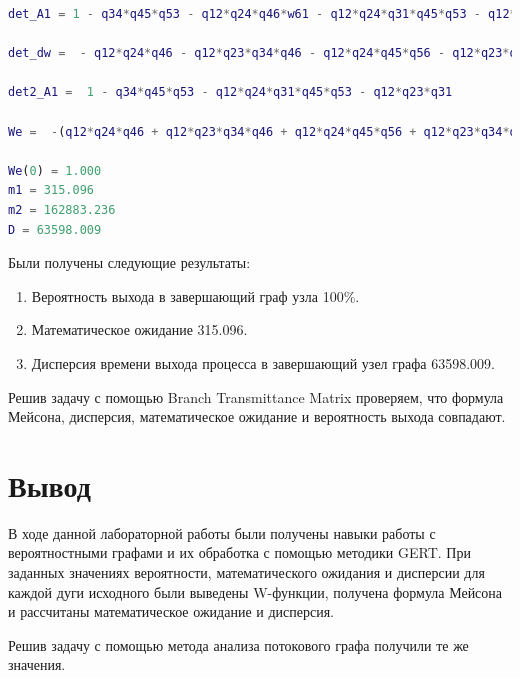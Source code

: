 \documentclass[14pt,a4paper,report]{report}
\begin{document}
\begin{lstlisting}[language={matlab}, caption={Результат}, basicstyle=\ttfamily]
det_A1 = 1 - q34*q45*q53 - q12*q24*q46*w61 - q12*q24*q31*q45*q53 - q12*q23*q34*q46*w61 - q12*q24*q45*q56*w61 - q12*q23*q34*q45*q56*w61 - q12*q23*q31
 
det_dw =  - q12*q24*q46 - q12*q23*q34*q46 - q12*q24*q45*q56 - q12*q23*q34*q45*q56
 
det2_A1 =  1 - q34*q45*q53 - q12*q24*q31*q45*q53 - q12*q23*q31
 
We =  -(q12*q24*q46 + q12*q23*q34*q46 + q12*q24*q45*q56 + q12*q23*q34*q45*q56)/(q12*q23*q31 + q34*q45*q53 + q12*q24*q31*q45*q53 - 1)
 
We(0) = 1.000
m1 = 315.096
m2 = 162883.236
D = 63598.009
\end{lstlisting}

Были получены следующие результаты:
\begin{enumerate}
\item Вероятность выхода в завершающий граф узла 100\%.
\item Математическое ожидание 315.096.
\item Дисперсия времени выхода процесса в завершающий узел графа 63598.009.
\end{enumerate}

Решив задачу с помощью Branch Transmittance Matrix проверяем, что формула Мейсона, дисперсия, математическое ожидание и вероятность выхода совпадают. 





\section{Вывод}
В ходе данной лабораторной работы были получены навыки работы с вероятностными графами и их обработка с помощью методики GERT. При заданных значениях вероятности, математического ожидания и дисперсии для каждой дуги исходного были выведены W-функции, получена формула Мейсона и рассчитаны математическое ожидание и дисперсия.

Решив задачу с помощью метода анализа потокового графа получили те же значения.
\end{document}
